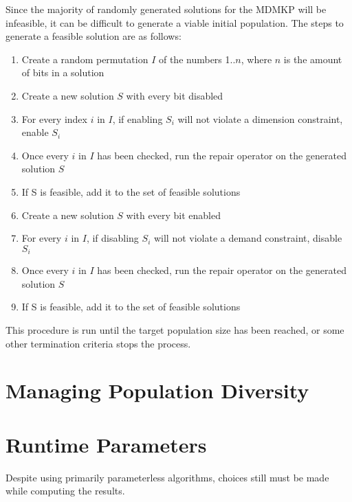 \documentclass[11pt, letterpaper, onecolumn]{article}
\begin{document}
Since the majority of randomly generated solutions for the MDMKP will be infeasible, it can be difficult to generate a viable initial population. The steps to generate a feasible solution are as follows:

\begin{enumerate}
\item Create a random permutation $I$ of the numbers 1..$n$, where $n$ is the amount of bits in a solution
\item Create a new solution $S$ with every bit disabled
\item For every index $i$ in $I$, if enabling $S_i$ will not violate a dimension constraint, enable $S_i$
\item Once every $i$ in $I$ has been checked, run the repair operator on the generated solution $S$
\item If S is feasible, add it to the set of feasible solutions
\item Create a new solution $S$ with every bit enabled
\item For every $i$ in $I$, if disabling $S_i$ will not violate a demand constraint, disable $S_i$
\item Once every $i$ in $I$ has been checked, run the repair operator on the generated solution $S$
\item If S is feasible, add it to the set of feasible solutions
\end{enumerate}

This procedure is run until the target population size has been reached, or some other termination criteria stops the process. 

\section{Managing Population Diversity}



\section{Runtime Parameters}

Despite using primarily parameterless algorithms, choices still must be made while computing the results. 

	

                                                     





\end{document}
